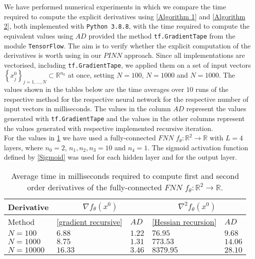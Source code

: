We have performed numerical experiments in which we compare the time required to compute the explicit derivatives using \cref{Algorithm 1} and \cref{Algorithm 2}, both implemented with \lstinline!Python 3.8.8!, with the time required to compute the equivalent values using $AD$ provided the method \lstinline!tf.GradientTape! from the module \lstinline!TensorFlow!. The aim is to verify whether the explicit computation of the derivatives is worth using in our $PINN$ approach. Since all implementations are vectorised, including \lstinline!tf.GradientTape!, we applied them on a set of input vectors $\left\{ x^0_j \right\}_{j=1,\ldots,N} \subset \mathbb{R}^{n_0}$ at once, setting $N=100$, $N=1000$ and $N=1000$. The values shown in the tables below are the time averages over $10$ runs of the respective method for the respective neural network for the respective number of input vectors in milliseconds. The values in the column $AD$ represent the values generated with \lstinline!tf.GradientTape! and the values in the other columns represent the values generated with respective implemented recursive iteration. \\   
For the values in \cref{tab:advs ecplicit: fnn} we have used a fully-connected $FNN$ $f_{\theta} \colon \mathbb{R}^2 \to \mathbb{R}$ with $L = 4$ layers, where $n_0 = 2$, $n_1, n_2, n_3 = 10$ and $n_4 = 1$. The sigmoid activation function defined by \cref{Sigmoid} was used for each hidden layer and for the output layer. 
\begin{table}[H]\label{tab:advs ecplicit: fnn}
    \resizebox{\textwidth}{!}
    {
        \begin{tabular}{l l l l l }
            \toprule
            Derivative & \multicolumn{2}{c}{$\nabla f_{\theta} \left( x^0 \right)$}& \multicolumn{2}{c}{$\nabla^2 f_{\theta} \left(x^0\right)$} \\ 
            \midrule
            Method & \cref{gradient recursive} & $AD$ & \cref{Hessian recursion} & $AD$ \\ 
            \midrule
            $N = 100$ & $6.88$ & $1.22$ & $76.95$ & $9.68$ \\ 
            \midrule
            $N = 1000$ & $8.75$ & $1.31$ & $773.53$ & $14.06$ \\ 
            \midrule
            $N = 10000$ & $16.33$ & $3.46$ & $8379.95$ & $28.10$ \\ 
            \bottomrule
        \end{tabular}
    }
    \caption{Average time in milliseconds required to compute first and second order derivatives of the fully-connected $FNN$ $f_{\theta} \colon \mathbb{R}^2 \to \mathbb{R}$.}
\end{table}
